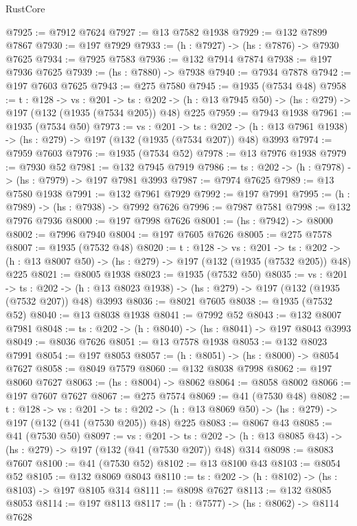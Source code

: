\begin{lexlean}{RustCore}
\begin{coremodule}
@7925 := @7912 @7624
@7927 := @13 @7582 @1938
@7929 := @132 @7899 @7867
@7930 := @197 @7929
@7933 := (h : @7927) -> (hs : @7876) -> @7930 @7625
@7934 := @7925 @7583
@7936 := @132 @7914 @7874
@7938 := @197 @7936 @7625
@7939 := (hs : @7880) -> @7938
@7940 := @7934 @7878
@7942 := @197 @7603 @7625
@7943 := @275 @7580
@7945 := @1935 (@7534 @48)
@7958 := {t : @128} ->
  {vs : @201} ->
  {ts : @202} -> (h : @13 @7945 @50) -> (hs : @279) -> @197 (@132 (@1935 (@7534 @205)) @48) @225
@7959 := @7943 @1938
@7961 := @1935 (@7534 @50)
@7973 := {vs : @201} ->
  {ts : @202} -> (h : @13 @7961 @1938) -> (hs : @279) -> @197 (@132 (@1935 (@7534 @207)) @48) @3993
@7974 := @7959 @7603
@7976 := @1935 (@7534 @52)
@7978 := @13 @7976 @1938
@7979 := @7930 @52
@7981 := @132 @7945 @7919
@7986 := {ts : @202} -> (h : @7978) -> (hs : @7979) -> @197 @7981 @3993
@7987 := @7974 @7625
@7989 := @13 @7580 @1938
@7991 := @132 @7961 @7929
@7992 := @197 @7991
@7995 := (h : @7989) -> (hs : @7938) -> @7992 @7626
@7996 := @7987 @7581
@7998 := @132 @7976 @7936
@8000 := @197 @7998 @7626
@8001 := (hs : @7942) -> @8000
@8002 := @7996 @7940
@8004 := @197 @7605 @7626
@8005 := @275 @7578
@8007 := @1935 (@7532 @48)
@8020 := {t : @128} ->
  {vs : @201} ->
  {ts : @202} -> (h : @13 @8007 @50) -> (hs : @279) -> @197 (@132 (@1935 (@7532 @205)) @48) @225
@8021 := @8005 @1938
@8023 := @1935 (@7532 @50)
@8035 := {vs : @201} ->
  {ts : @202} -> (h : @13 @8023 @1938) -> (hs : @279) -> @197 (@132 (@1935 (@7532 @207)) @48) @3993
@8036 := @8021 @7605
@8038 := @1935 (@7532 @52)
@8040 := @13 @8038 @1938
@8041 := @7992 @52
@8043 := @132 @8007 @7981
@8048 := {ts : @202} -> (h : @8040) -> (hs : @8041) -> @197 @8043 @3993
@8049 := @8036 @7626
@8051 := @13 @7578 @1938
@8053 := @132 @8023 @7991
@8054 := @197 @8053
@8057 := (h : @8051) -> (hs : @8000) -> @8054 @7627
@8058 := @8049 @7579
@8060 := @132 @8038 @7998
@8062 := @197 @8060 @7627
@8063 := (hs : @8004) -> @8062
@8064 := @8058 @8002
@8066 := @197 @7607 @7627
@8067 := @275 @7574
@8069 := @41 (@7530 @48)
@8082 := {t : @128} ->
  {vs : @201} ->
  {ts : @202} -> (h : @13 @8069 @50) -> (hs : @279) -> @197 (@132 (@41 (@7530 @205)) @48) @225
@8083 := @8067 @43
@8085 := @41 (@7530 @50)
@8097 := {vs : @201} ->
  {ts : @202} -> (h : @13 @8085 @43) -> (hs : @279) -> @197 (@132 (@41 (@7530 @207)) @48) @314
@8098 := @8083 @7607
@8100 := @41 (@7530 @52)
@8102 := @13 @8100 @43
@8103 := @8054 @52
@8105 := @132 @8069 @8043
@8110 := {ts : @202} -> (h : @8102) -> (hs : @8103) -> @197 @8105 @314
@8111 := @8098 @7627
@8113 := @132 @8085 @8053
@8114 := @197 @8113
@8117 := (h : @7577) -> (hs : @8062) -> @8114 @7628

\end{coremodule}
\end{lexlean}
